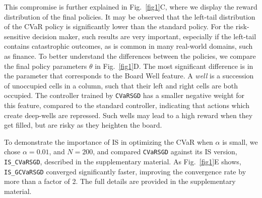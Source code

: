\documentclass[letterpaper]{article}
\begin{document}
This compromise is further explained in Fig.~\ref{fig1}C, where we display the reward distribution of the final policies.
It may be observed that the left-tail distribution of the CVaR policy is significantly lower than the standard policy. For the risk-sensitive decision maker, such results are very important, especially if the left-tail contains catastrophic outcomes, as is common in many real-world domains, such as finance.
To better understand the differences between the policies, we compare the final policy parameters $\theta$ in Fig.~\ref{fig1}D. The most significant difference is in the parameter that corresponds to the Board Well feature. A \textit{well} is a succession of unoccupied cells in a column, such that their left and right cells are both occupied. The controller trained by \texttt{CVaRSGD} has a smaller negative weight for this feature, compared to the standard controller, indicating that actions which create deep-wells are repressed. Such wells may lead to a high reward when they get filled, but are risky as they heighten the board.

To demonstrate the importance of IS in optimizing the CVaR when $\alpha$ is small, we chose $\alpha=0.01$, and $N = 200$, and compared \texttt{CVaRSGD} against its IS version, \texttt{IS\_CVaRSGD}, described in the supplementary material.
As Fig.~\ref{fig1}E shows, \texttt{IS\_GCVaRSGD} converged significantly faster, improving the convergence rate by more than a factor of 2. The full details are provided in the supplementary material.
\end{document}
